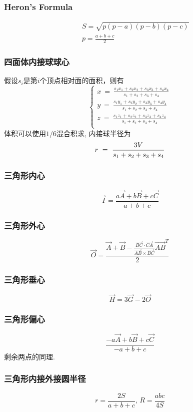 \begin{small}
\begin{spacing}{0.5}
\begin{multicols*}{2}
	\subsubsection{Heron's Formula}
	\begin{eqnarray*}
		&& S=\sqrt{p(p-a)(p-b)(p-c)} \\
		&& p=\frac{a+b+c}{2}
	\end{eqnarray*}
\subsubsection{四面体内接球球心}
假设$s_i$是第$i$个顶点相对面的面积，则有
\[\left\{
\begin{aligned}
x \ = \ \frac{s_1x_1+s_2x_2+s_3x_3+s_4x_4}{s_1+s_2+s_3+s_4}\\
y \ = \ \frac{s_1y_1+s_2y_2+s_3y_3+s_4y_4}{s_1+s_2+s_3+s_4}\\
z \ = \ \frac{s_1z_1+s_2z_2+s_3z_3+s_4z_4}{s_1+s_2+s_3+s_4}\\
\end{aligned}\right.\]
体积可以使用$1/6$混合积求, 内接球半径为
\[
r \ = \ \frac{3V}{s_1+s_2+s_3+s_4} \\
\]
\subsubsection{三角形内心}
	\[ \vec{I} = \frac{a\vec {A} + b\vec{B} + c\vec{C}}{a + b + c} \]
\subsubsection{三角形外心}
	\[ \vec{O} = \frac{\vec{A} + \vec{B} - \frac{\overrightarrow {BC} \cdot \overrightarrow{CA}}{\overrightarrow {AB} \times \overrightarrow{BC}}\overrightarrow {AB}^T}{2} \]
\subsubsection{三角形垂心}
	\[ \vec{H} = 3\vec{G} - 2\vec{O} \]
\subsubsection{三角形偏心}
	\[ \frac{-a\vec {A} + b\vec{B} + c\vec{C}}{-a + b + c} \]
	剩余两点的同理. 
\subsubsection{三角形内接外接圆半径}
	\[ r=\frac{2S}{a+b+c},\, R=\frac{abc}{4S} \]
\end{multicols*}

\end{spacing}
\end{small}
